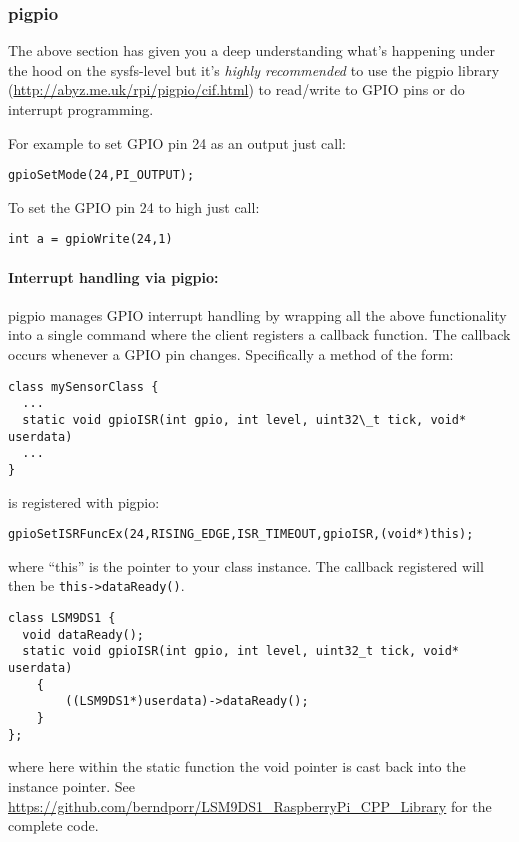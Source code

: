 \documentclass[12pt]{report}
\begin{document}
\subsubsection{pigpio}
The above section has given you a deep understanding what's happening
under the hood on the sysfs-level but it's \textsl{highly recommended} to
use the pigpio library (\url{http://abyz.me.uk/rpi/pigpio/cif.html})
to read/write to GPIO pins or do interrupt programming.

For example to set GPIO pin 24 as an output just call:
\begin{verbatim}
gpioSetMode(24,PI_OUTPUT);
\end{verbatim}

To set the GPIO pin 24 to high just call:
\begin{verbatim}
int a = gpioWrite(24,1)
\end{verbatim}

\paragraph{Interrupt handling via pigpio:}
pigpio manages GPIO interrupt handling by wrapping all the above
functionality into a single command where the client registers a
callback function. The callback occurs whenever a GPIO pin changes.
Specifically a method of the form:
\begin{verbatim}
class mySensorClass {
  ...
  static void gpioISR(int gpio, int level, uint32\_t tick, void* userdata)
  ...
}
\end{verbatim}
is registered with pigpio:
\begin{verbatim}
gpioSetISRFuncEx(24,RISING_EDGE,ISR_TIMEOUT,gpioISR,(void*)this);
\end{verbatim}
where ``this'' is the pointer to your class instance.
The callback registered will then be \texttt{this->dataReady()}.
\begin{verbatim}
class LSM9DS1 {
  void dataReady();
  static void gpioISR(int gpio, int level, uint32_t tick, void* userdata)
    {
        ((LSM9DS1*)userdata)->dataReady();
    }
};
\end{verbatim}
where here within the static function the void pointer is cast back into the instance pointer.
See \url{https://github.com/berndporr/LSM9DS1_RaspberryPi_CPP_Library} for the complete code.
\end{document}
